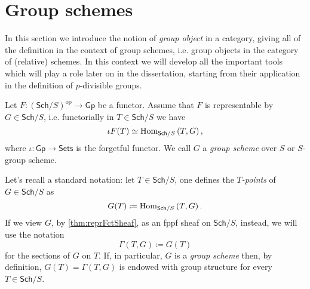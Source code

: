 \section{Group schemes}
In this section we introduce the notion of \emph{group object}
in a category, giving all of the definition in the context
of group schemes, i.e. group objects in the category of (relative) schemes.
In this context we will develop all the important tools which will play a role
later on in the dissertation, starting from their application in the definition of
$p$-divisible groups.


\begin{defn}
	Let $F\colon (\mathsf{Sch}/S)^{\mathrm{op}} \to \mathsf{Gp}$ be a functor.
	Assume that $F$ is representable by $G \in \mathsf{Sch}/S$, i.e. 
	functorially in $T \in \mathsf{Sch}/S$ we have
	\begin{equation*}
		\iota F(T) \simeq \operatorname{Hom}_{\mathsf{Sch}/S} \left( T, G \right)
	,\end{equation*} 
	where $\iota\colon \mathsf{Gp} \to \mathsf{Sets}$ is the forgetful functor.
	We call $G$ a \emph{group scheme} over $S$
	or $S$-group scheme.
\end{defn}


\begin{rem}
	Let's recall a standard notation: let $T \in \mathsf{Sch}/S$, one defines
	the \emph{$T$-points} of $G \in \mathsf{Sch}/S$ as
	\begin{equation*}
		G(T) \coloneqq \operatorname{Hom}_{\mathsf{Sch}/S} \left( T, G \right)
	.\end{equation*} 
	If we view $G$, by \cref{thm:reprFctSheaf}, as an fppf sheaf on $\mathsf{Sch}/S$, instead,
	we will use the notation
	\begin{equation*}
		\Gamma \left( T, G \right) \coloneqq G(T)
	\end{equation*}
	for the sections of $G$ on $T$.
	If, in particular, $G$ is a \emph{group scheme} then, by definition,
	$G(T) = \Gamma(T,G)$ is endowed with group structure for every $T \in \mathsf{Sch}/S$.
\end{rem}


